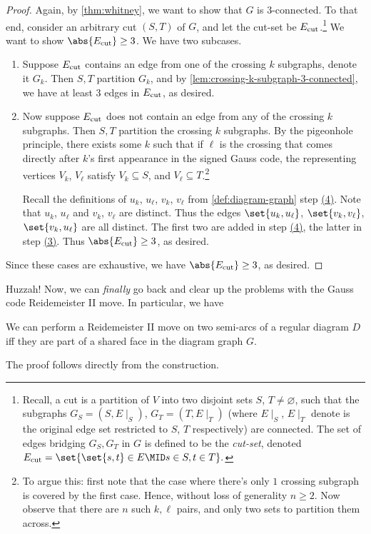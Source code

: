 \begin{proof}
  Again, by \cref{thm:whitney}, we want to show that $G$ is
  $3$-connected. To that end, consider an arbitrary cut $(S,T)$ of
  $G$, and let the cut-set be $E_{\rm cut}$.\footnote{Recall, a cut is
    a partition of $V$ into two disjoint sets $S$, $T \neq
    \varnothing$, such that the subgraphs $G_S = (S, E\mid_S)$, $G_T =
    (T, E\mid_T)$ (where $E\mid_S$, $E\mid_T$ denote is the original
    edge set restricted to $S$, $T$ respectively) are connected. The
    set of edges bridging $G_S, G_T$ in $G$ is defined to be the
    \emph{cut-set}, denoted $E_{\rm cut} = \set{\set{s,t} \in E \MID s
      \in S, t \in T}.$} We want to show $\abs{E_{\rm cut}} \geq 3$.
  We have two subcases.

  \begin{enumerate}
    \item Suppose $E_{\rm cut}$ contains an edge from one of the
      crossing $k$ subgraphs, denote it $G_k$. Then $S,T$ partition
      $G_k$, and by \cref{lem:crossing-k-subgraph-3-connected}, we
      have at least $3$ edges in $E_{\rm cut}$, as desired.
    \item  Now suppose $E_{\rm cut}$ does not contain an edge from any
      of the crossing $k$ subgraphs. Then $S, T$ partition the
      crossing $k$ subgraphs. By the pigeonhole principle, there
      exists some $k$ such that if $\ell$ is the crossing that comes
      directly after $k$'s first appearance in the signed Gauss code,
      the representing vertices $V_k$, $V_\ell$ satisfy $V_k
      \subseteq S$, and $V_\ell \subseteq T$.\footnote{To argue this:
      first note that the case where there's only $1$ crossing
      subgraph is covered by the first case. Hence, without loss of
      generality $n \geq 2$. Now observe that there are $n$ such $k,
      \ell$ pairs, and only two sets to partition them across.}

      Recall the definitions of $u_k$, $u_\ell$, $v_k$, $v_\ell$ from
      \cref{def:diagram-graph} step \hyperlink{graph-step-4}{(4)}.
      Note that $u_k$, $u_\ell$ and $v_k$, $v_\ell$ are distinct. Thus
      the edges $\set{u_k, u_\ell}$, $\set{v_k, v_\ell}$, $\set{v_k,
      u_\ell}$ are all distinct. The first two are added in step
      \hyperlink{graph-step-4}{(4)}, the latter in step
      \hyperlink{graph-step-3}{(3)}. Thus $\abs{E_{\rm cut}} \geq 3$,
      as desired.
  \end{enumerate}
  Since these cases are exhaustive, we have $\abs{E_{\rm cut}} \geq
  3$, as desired.
\end{proof}
Huzzah! Now, we can \emph{finally} go back and clear up the problems
with the Gauss code Reidemeister II move. In particular, we have
\begin{proposition}
  We can perform a Reidemeister II move on two semi-arcs of a
  regular diagram $D$ iff they are part of a shared face in the
  diagram graph $G$.
\end{proposition}
The proof follows directly from the construction.

